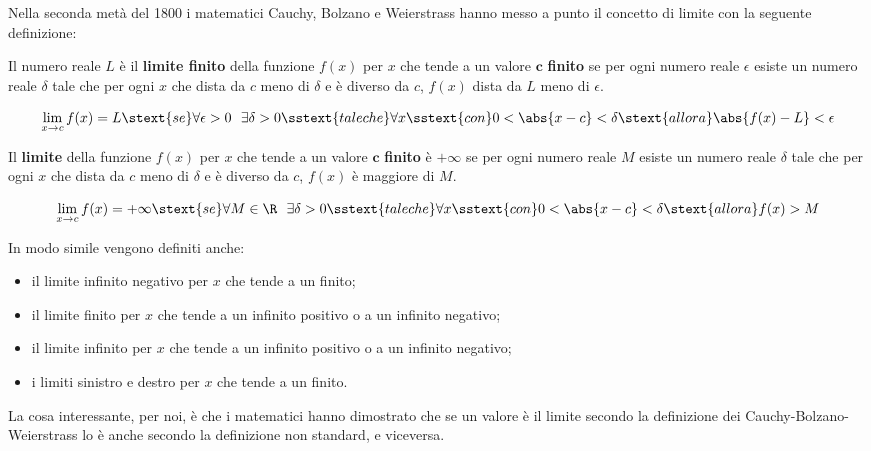 Nella seconda metà del 1800 i matematici Cauchy, Bolzano e Weierstrass  
hanno messo a punto il concetto di limite con la seguente definizione:

\begin{definizione}
Il numero reale \(L\) è il \textbf{limite finito} della funzione \(f(x)\) 
per \(x\) che tende a un valore \(\mathbf{c}\) \textbf{finito} 
se per ogni numero reale \(\epsilon\) 
esiste un numero reale \(\delta\) tale che 
per ogni \(x\) che dista da \(c\) meno di \(\delta\) e 
è diverso da \(c\),
\(f(x)\) dista da \(L\) meno di \(\epsilon\).

\[\lim_{x \rightarrow c}f(x) = L \stext{se}
\forall \epsilon > 0 ~~ \exists \delta > 0 
\sstext{tale che} \forall x \sstext{con} 0 < \abs{x - c} < \delta
\stext{allora} 
\abs{f(x) - L} < \epsilon\]
\end{definizione}

\begin{definizione}
Il \textbf{limite} della funzione \(f(x)\) 
per \(x\) che tende a un valore \(\mathbf{c}\) \textbf{finito} 
è \(+\infty\)
se per ogni numero reale \(M\) 
esiste un numero reale \(\delta\) tale che 
per ogni \(x\) che dista da \(c\) meno di \(\delta\) e 
è diverso da \(c\),
\(f(x)\) è maggiore di \(M\).

\[\lim_{x \rightarrow c}f(x) = +\infty \stext{se}
\forall M \in \R ~~ \exists \delta > 0 
\sstext{tale che} \forall x \sstext{con} 0 < \abs{x - c} < \delta
\stext{allora} f(x) > M\]
\end{definizione}


In modo simile vengono definiti anche:
\begin{itemize} [noitemsep]
\item il limite infinito negativo per \(x\) che tende a un finito;
\item il limite finito per \(x\) che tende a un infinito positivo o 
a un infinito negativo;
\item il limite infinito per \(x\) che tende a un infinito positivo o 
a un infinito negativo;
\item i limiti sinistro e destro per \(x\) che tende a un finito.
\end{itemize}

La cosa interessante, per noi, è che i matematici hanno dimostrato che se un 
valore è il limite secondo la definizione dei Cauchy-Bolzano-Weierstrass 
lo è anche secondo la definizione non standard, e viceversa.
